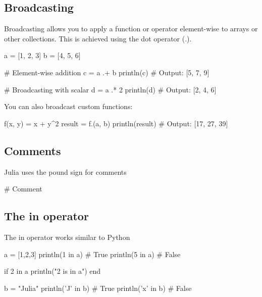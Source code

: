 \documentclass{report}
\begin{document}
    \bigbreak \noindent 
    \subsection{Broadcasting}
    \bigbreak \noindent 
    Broadcasting allows you to apply a function or operator element-wise to arrays or other collections. This is achieved using the dot operator (.).
    \bigbreak \noindent 
    \begin{jlcode}
        a = [1, 2, 3]
        b = [4, 5, 6]

        # Element-wise addition
        c = a .+ b
        println(c)  # Output: [5, 7, 9]

        # Broadcasting with scalar
        d = a .* 2
        println(d)  # Output: [2, 4, 6]
    \end{jlcode}
    \bigbreak \noindent 
    You can also broadcast custom functions:
    \bigbreak \noindent 
    \begin{jlcode}
        f(x, y) = x + y^2
        result = f.(a, b)
        println(result)  # Output: [17, 27, 39]
    \end{jlcode}








    \bigbreak \noindent 
    \subsection{Comments}
    \bigbreak \noindent 
    Julia uses the pound sign for comments
    \bigbreak \noindent 
    \begin{jlcode}
    # Comment
    \end{jlcode}

    \bigbreak \noindent 
    \subsection{The in operator}
    \bigbreak \noindent 
    The in operator works similar to Python
    \bigbreak \noindent 
    \begin{jlcode}
        a = [1,2,3]
        println(1 in a) # True
        println(5 in a) # False

        if 2 in a
            println("2 is in a")
        end

        b = "Julia"
        println('J' in b) # True
        println('x' in b) # False
    \end{jlcode}
\end{document}
